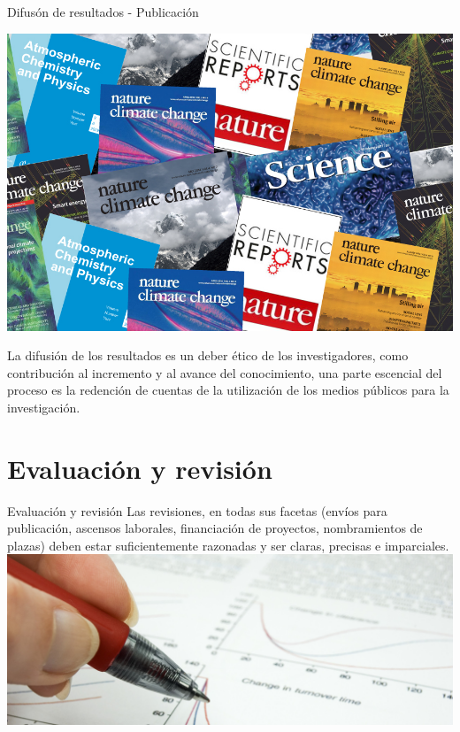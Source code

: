 \begin{frame}{Difusón de resultados - Publicación}
    \begin{minipage}{0.45\linewidth}
        \centering
        \includegraphics[scale=0.2]{images/ima9.jpg}
    \end{minipage}
    \hspace{0.3cm}
    \begin{minipage}{0.5\linewidth}
    La difusión de los resultados es un deber ético de los investigadores, como contribución al incremento
y al avance del conocimiento, una parte escencial del proceso es la redención de cuentas de la utilización 
de los medios públicos para la investigación.
    \end{minipage}
\end{frame}
\section{Evaluación y revisión}
\begin{frame}{Evaluación y revisión}
        Las revisiones, en todas sus facetas (envíos para publicación, ascensos laborales, financiación de
proyectos, nombramientos de plazas) deben estar suficientemente razonadas y ser claras, precisas
e imparciales.\vspace{0.7cm}\\
\centering
\includegraphics[scale=0.7]{images/ima10.jpg}
\end{frame}
